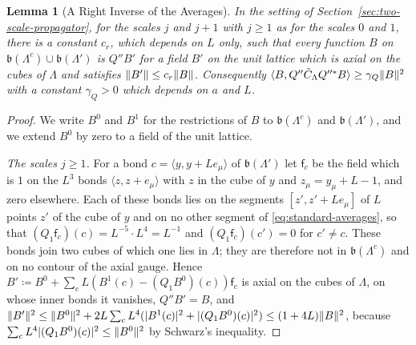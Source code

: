 \documentclass[11pt]{preprint}
\DeclarePairedDelimiter{\abs}{\lvert}{\rvert}
\DeclarePairedDelimiter{\norm}{\lVert}{\rVert}
\numberwithin{equation}{section}
\newtheorem{lemma}[theorem]{Lemma}
\theoremstyle{definition}
\theoremstyle{remark}
\theoremstyle{plain}
\begin{document}
\begin{lemma}[A Right Inverse of the Averages]\label{lem:right-inverse}
In the setting of Section~\ref{sec:two-scale-propagator}, for the scales $j$ and $j + 1$ with $j \geq 1$ as for the scales $0$ and $1$, there is a constant $c_r$, which depends on $L$ only, such that every function $B$ on $\mathfrak b(\Lambda^c) \cup \mathfrak b(\Lambda')$ is $Q''B'$ for a field $B'$ on the unit lattice which is axial on the cubes of $\Lambda$ and satisfies $\norm{B'} \leq c_r\norm B$. Consequently $\langle B, Q''\tilde C_\Lambda Q''^*B\rangle \geq \gamma_Q\norm B^2$ with a constant $\gamma_Q > 0$ which depends on $a$ and $L$.
\end{lemma}

\begin{proof}
We write $B^0$ and $B^1$ for the restrictions of $B$ to $\mathfrak b(\Lambda^c)$ and $\mathfrak b(\Lambda')$, and we extend $B^0$ by zero to a field of the unit lattice.

\emph{The scales $j \geq 1$.} For a bond $c = \langle y, y + Le_\mu\rangle$ of $\mathfrak b(\Lambda')$ let $\mathsf f_c$ be the field which is $1$ on the $L^3$ bonds $\langle z, z + e_\mu\rangle$ with $z$ in the cube of $y$ and $z_\mu = y_\mu + L - 1$, and zero elsewhere. Each of these bonds lies on the segments $[z', z' + Le_\mu]$ of $L$ points $z'$ of the cube of $y$ and on no other segment of \eqref{eq:standard-averages}, so that $(Q_1\mathsf f_c)(c) = L^{-5} \cdot L^4 = L^{-1}$ and $(Q_1\mathsf f_c)(c') = 0$ for $c' \neq c$. These bonds join two cubes of which one lies in $\Lambda$; they are therefore not in $\mathfrak b(\Lambda^c)$ and on no contour of the axial gauge. Hence $B' \coloneqq B^0 + \sum_cL(B^1(c) - (Q_1B^0)(c))\mathsf f_c$ is axial on the cubes of $\Lambda$, on whose inner bonds it vanishes, $Q''B' = B$, and $\norm{B'}^2 \leq \norm{B^0}^2 + 2L\sum_cL^4(\abs{B^1(c)}^2 + \abs{(Q_1B^0)(c)}^2) \leq (1 + 4L)\norm B^2$, because $\sum_cL^4\abs{(Q_1B^0)(c)}^2 \leq \norm{B^0}^2$ by Schwarz's inequality.


\end{proof}
\end{document}
